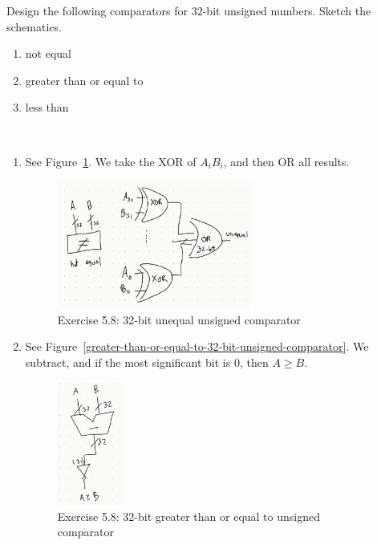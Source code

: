\documentclass[12pt]{article}
\newenvironment{ex}[2][Exercise]{\begin{trivlist}
		\item[\hskip \labelsep {\bfseries #1}\hskip \labelsep {\bfseries #2.}]}{\end{trivlist}}
\newenvironment{sol}[1][Solution]{\begin{trivlist}
		\item[\hskip \labelsep {\bfseries #1:}]}{\end{trivlist}}
\begin{document}
\begin{ex}{5.8}
	Design the following comparators for $32$-bit unsigned numbers. Sketch the schematics.
	\begin{enumerate}[label=(\alph*)]
		\item not equal
		\item greater than or equal to
		\item less than
	\end{enumerate}
\end{ex}

\begin{sol}
	\
	\begin{enumerate}[label=(\alph*)]
		\item See Figure~\ref{unequal-32-bit-unsigned-comparator}. We take the
		XOR of $A_iB_i$, and then OR all results.
		\begin{figure}
			\centering
			\includegraphics[width=0.6\textwidth]{unequal-32-bit-unsigned-comparator}
			\caption{Exercise 5.8: 32-bit unequal unsigned comparator}
			\label{unequal-32-bit-unsigned-comparator}
		\end{figure}
		\item See Figure~\ref{greater-than-or-equal-to-32-bit-unsigned-comparator}.
		We subtract, and if the most significant bit is 0, then $A\geq B$.
		\begin{figure}
			\centering
			\includegraphics[width=0.2\textwidth]{greater-than-or-equal-to-32-bit-unsigned-comparator}
			\caption{Exercise 5.8: 32-bit greater than or equal to unsigned comparator}

\end{figure}
\end{enumerate}
\end{sol}
\end{document}
